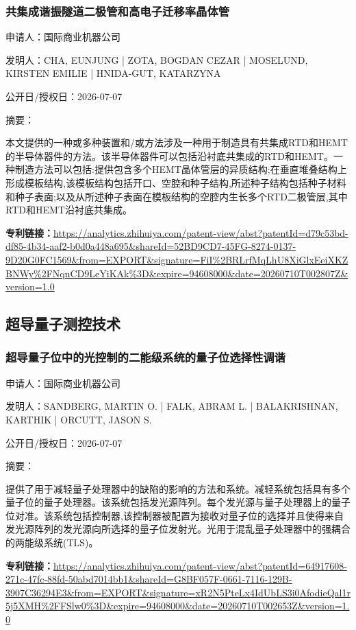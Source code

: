 \documentclass[12pt,a4paper]{ctexart}
\begin{document}
\subsubsection{ 共集成谐振隧道二极管和高电子迁移率晶体管 }

申请人：国际商业机器公司

发明人：CHA, EUNJUNG | ZOTA, BOGDAN CEZAR | MOSELUND, KIRSTEN EMILIE | HNIDA-GUT, KATARZYNA

公开日/授权日：2026-07-07

摘要：

本文提供的一种或多种装置和/或方法涉及一种用于制造具有共集成RTD和HEMT的半导体器件的方法。该半导体器件可以包括沿衬底共集成的RTD和HEMT。一种制造方法可以包括:提供包含多个HEMT晶体管层的异质结构;在垂直堆叠结构上形成模板结构,该模板结构包括开口、空腔和种子结构,所述种子结构包括种子材料和种子表面;以及从所述种子表面在模板结构的空腔内生长多个RTD二极管层,其中RTD和HEMT沿衬底共集成。

\noindent\textbf{专利链接：}\url{https://analytics.zhihuiya.com/patent-view/abst?patentId=d79c53bd-df85-4b34-aaf2-b0d0a448a695&shareId=52BD9CD7-45FG-8274-0137-9D20G0FC1569&from=EXPORT&signature=FiI%2BRLrfMqLhU8XiGlxEeiXKZBNWy%2FNqnCD9LeYiKAk%3D&expire=94608000&date=20260710T002807Z&version=1.0}


\subsection{ 超导量子测控技术 }

\subsubsection{ 超导量子位中的光控制的二能级系统的量子位选择性调谐 }

申请人：国际商业机器公司

发明人：SANDBERG, MARTIN O. | FALK, ABRAM L. | BALAKRISHNAN, KARTHIK | ORCUTT, JASON S.

公开日/授权日：2026-07-07

摘要：

提供了用于减轻量子处理器中的缺陷的影响的方法和系统。减轻系统包括具有多个量子位的量子处理器。该系统包括发光源阵列。每个发光源与量子处理器上的量子位对准。该系统包括控制器,该控制器被配置为接收对量子位的选择并且使得来自发光源阵列的发光源向所选择的量子位发射光。光用于混乱量子处理器中的强耦合的两能级系统(TLS)。

\noindent\textbf{专利链接：}\url{https://analytics.zhihuiya.com/patent-view/abst?patentId=64917608-271c-47fc-88fd-50abd7014bb1&shareId=G8BF057F-0661-7116-129B-3907C36294E3&from=EXPORT&signature=xR2N5PteLx4IdUbLS3i0AfodieQal1r5j5XMH%2FFSlw0%3D&expire=94608000&date=20260710T002653Z&version=1.0}
\end{document}
